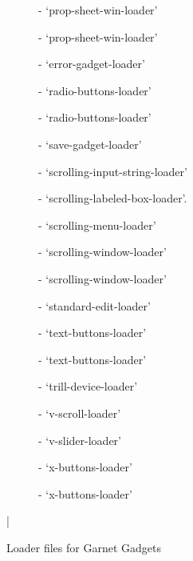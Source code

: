 \begin{figure}
\begin{description}
\item[]  - `prop-sheet-win-loader'

\item[]  - `prop-sheet-win-loader'

\item[]  - `error-gadget-loader'

\item[]  - `radio-buttons-loader'

\item[]  - `radio-buttons-loader'

\item[]  - `save-gadget-loader'

\item[]  - `scrolling-input-string-loader'

\item[]  - `scrolling-labeled-box-loader'.

\item[]  - `scrolling-menu-loader'

\item[]  - `scrolling-window-loader'

\item[]  - `scrolling-window-loader'

\item[]  - `standard-edit-loader'

\item[]  - `text-buttons-loader'

\item[]  - `text-buttons-loader'

\item[]  - `trill-device-loader'

\item[]  - `v-scroll-loader'

\item[]  - `v-slider-loader'

\item[]  - `x-buttons-loader'

\item[]  - `x-buttons-loader'

\end{description}
\caption{Loader files for Garnet Gadgets}
\bar{}
\end{figure}



